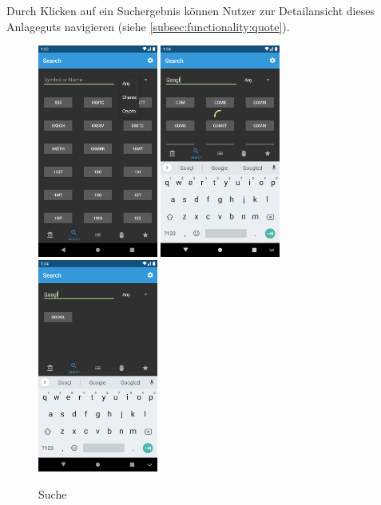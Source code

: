 \documentclass[a4paper]{article}
\begin{document}
Durch Klicken auf ein Suchergebnis können Nutzer zur Detailansicht dieses Anlageguts navigieren (siehe \autoref{subsec:functionality:quote}).

\begin{figure}[H]
	\centering
	\includegraphics[height=7cm,keepaspectratio]{./images/search_type.png}
	\includegraphics[height=7cm,keepaspectratio]{./images/search_loading.png}
	\includegraphics[height=7cm,keepaspectratio]{./images/search_done.png}
	\caption{Suche}
	\label{fig:functionality:search:full}
\end{figure}
\end{document}

